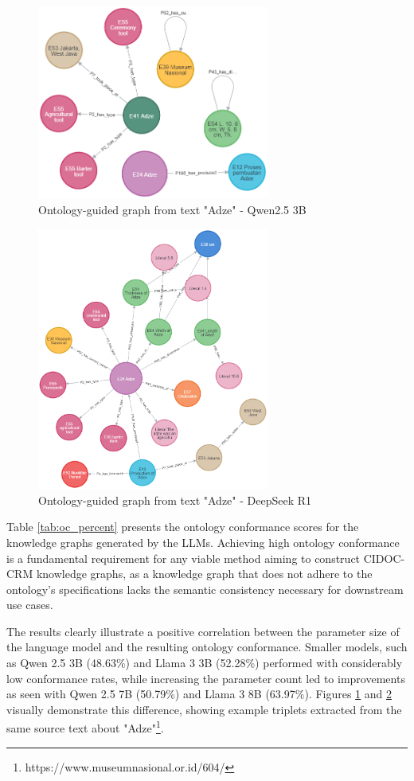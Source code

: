 \documentclass[a4, conference]{IEEEtran}
\begin{document}
\begin{figure}[!t]
    \centering
    \includegraphics[width=3in]{assets/graph-qwen3b-adze}
    \caption{Ontology-guided graph from text "Adze" - Qwen2.5 3B}
    \label{fig_graph_qwen3b_adze}
\end{figure}

\begin{figure}[!t]
    \centering
    \includegraphics[width=3in]{assets/graph-r1-adze}
    \caption{Ontology-guided graph from text "Adze" - DeepSeek R1}
    \label{fig_graph_r1_adze}
\end{figure}

Table \ref{tab:oc_percent} presents the ontology conformance scores for the knowledge graphs generated by the LLMs. Achieving high ontology conformance is a fundamental requirement for any viable method aiming to construct CIDOC-CRM knowledge graphs, as a knowledge graph that does not adhere to the ontology's specifications lacks the semantic consistency necessary for downstream use cases.

The results clearly illustrate a positive correlation between the parameter size of the language model and the resulting ontology conformance. Smaller models, such as Qwen 2.5 3B (48.63\%) and Llama 3 3B (52.28\%) performed with considerably low conformance rates, while increasing the parameter count led to improvements as seen with Qwen 2.5 7B (50.79\%) and Llama 3 8B (63.97\%). Figures \ref{fig_graph_qwen3b_adze} and \ref{fig_graph_r1_adze} visually demonstrate this difference, showing example triplets extracted from the same source text about "Adze"\footnote{https://www.museumnasional.or.id/604/}.
\end{document}
